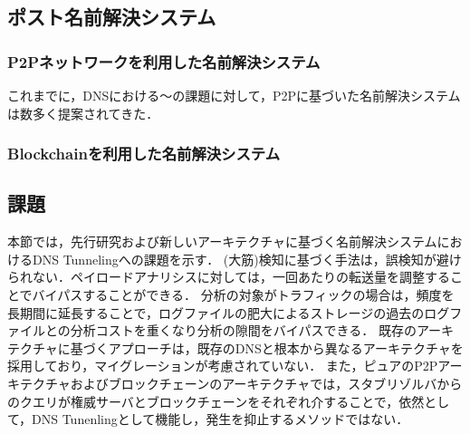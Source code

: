 \subsection{ポスト名前解決システム}
\subsubsection{P2Pネットワークを利用した名前解決システム}
これまでに，DNSにおける〜の課題に対して，P2Pに基づいた名前解決システムは数多く提案されてきた．
\subsubsection{Blockchainを利用した名前解決システム}
\subsection{課題}
\label{sec:issue-past-works}
本節では，先行研究および新しいアーキテクチャに基づく名前解決システムにおけるDNS Tunnelingへの課題を示す．
(大筋)検知に基づく手法は，誤検知が避けられない．ペイロードアナリシスに対しては，一回あたりの転送量を調整することでバイパスすることができる．
分析の対象がトラフィックの場合は，頻度を長期間に延長することで，ログファイルの肥大によるストレージの過去のログファイルとの分析コストを重くなり分析の隙間をバイパスできる．
既存のアーキテクチャに基づくアプローチは，既存のDNSと根本から異なるアーキテクチャを採用しており，マイグレーションが考慮されていない．
また，ピュアのP2Pアーキテクチャおよびブロックチェーンのアーキテクチャでは，スタブリゾルバからのクエリが権威サーバとブロックチェーンをそれぞれ介することで，依然として，DNS Tunenlingとして機能し，発生を抑止するメソッドではない．

